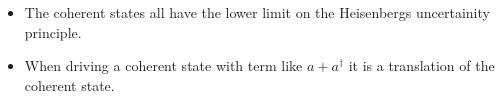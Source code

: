 \begin{itemize}
    \item The coherent states all have the lower limit on the Heisenbergs uncertainity principle.
    \item When driving a coherent state with term like $a + a^\dagger$ it is a translation of the coherent state.
\end{itemize}


